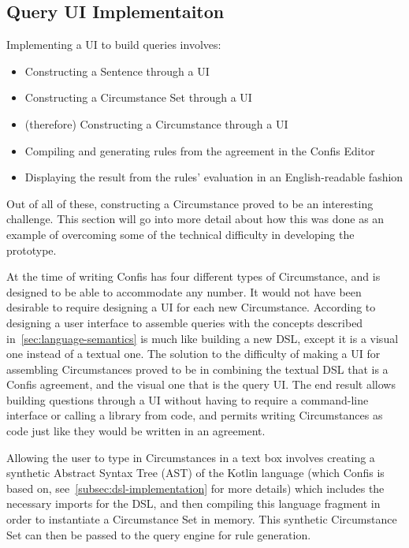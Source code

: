 \subsection{Query UI Implementaiton}\label{subsec:query-ui-implementaiton}

Implementing a UI to build queries involves:
\begin{itemize}
    \item Constructing a Sentence through a UI
    \item Constructing a Circumstance Set through a UI
    \item (therefore) Constructing a Circumstance through a UI
    \item Compiling and generating rules from the agreement in the Confis Editor
    \item Displaying the result from the rules' evaluation in an English-readable fashion
\end{itemize}

Out of all of these, constructing a Circumstance proved to be an interesting challenge.
This section will go into more detail about how this was done as an example of overcoming some of the technical difficulty in developing the prototype.

At the time of writing Confis has four different types of Circumstance, and is designed to be able to accommodate any number.
It would not have been desirable to require designing a UI for each new Circumstance.
According to~\cite{fowlerLangWorkbench} designing a user interface to assemble queries with the concepts described in~\autoref{sec:language-semantics} is much like building a new DSL, except it is a visual one instead of a textual one.
The solution to the difficulty of making a UI for assembling Circumstances proved to be in combining the textual DSL that is a Confis agreement, and the visual one that is the query UI\@.
The end result allows building questions through a UI without having to require a command-line interface or calling a library from code, and permits writing Circumstances as code just like they would be written in an agreement.

Allowing the user to type in Circumstances in a text box involves creating a synthetic Abstract Syntax Tree (AST) of the Kotlin language (which Confis is based on, see~\autoref{subsec:dsl-implementation} for more details) which includes the necessary imports for the DSL, and then compiling this language fragment in order to instantiate a Circumstance Set in memory.
This synthetic Circumstance Set can then be passed to the query engine for rule generation.

